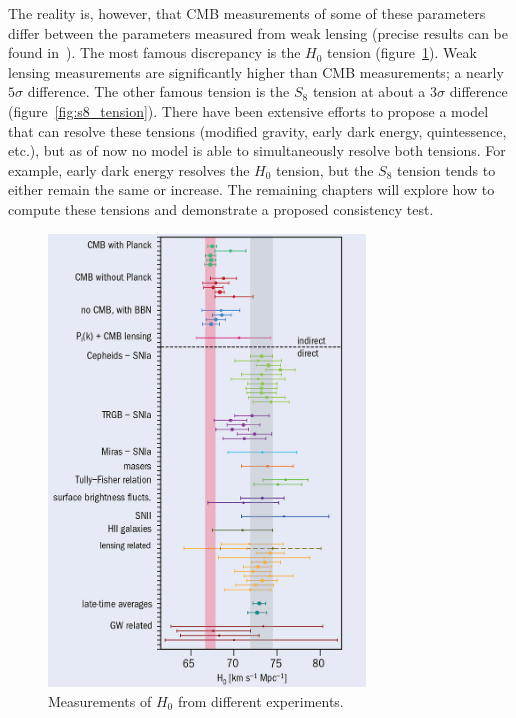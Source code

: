 The reality is, however, that CMB measurements of some of these parameters differ between the parameters measured from weak lensing (precise results can be found in~\cite{amon_dark_2022,noauthor_planck_2018}). The most famous discrepancy is the $H_0$ tension (figure~\ref{fig:h0_tension}). Weak lensing measurements are significantly higher than CMB measurements; a nearly $5\sigma$ difference. The other famous tension is the $S_8$ tension at about a $3\sigma$ difference (figure~\ref{fig:s8_tension}). There have been extensive efforts to propose a model that can resolve these tensions (modified gravity, early dark energy, quintessence, etc.), but as of now no model is able to simultaneously resolve both tensions. For example, early dark energy resolves the $H_0$ tension, but the $S_8$ tension tends to either remain the same or increase. The remaining chapters will explore how to compute these tensions and demonstrate a proposed consistency test.
\begin{figure}[ht]
	\centering
	\includegraphics[width=0.75\textwidth]{plots/h0_tension.jpg}
	\caption{Measurements of $H_0$ from different experiments.}
	\label{fig:h0_tension}
\end{figure}
